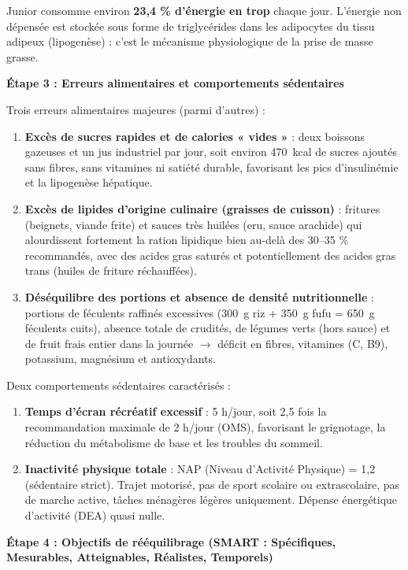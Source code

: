 \documentclass[11pt]{article}
\begin{document}
\begin{exoresolu}
Junior consomme environ \textbf{23,4 \% d'énergie en trop} chaque jour. L'énergie non dépensée est stockée sous forme de triglycérides dans les adipocytes du tissu adipeux (lipogenèse) : c'est le mécanisme physiologique de la prise de masse grasse.

\textbf{Étape 3 : Erreurs alimentaires et comportements sédentaires}

Trois erreurs alimentaires majeures (parmi d'autres) :
\begin{enumerate}
\item \textbf{Excès de sucres rapides et de calories « vides »} : deux boissons gazeuses et un jus industriel par jour, soit environ \SI{470}{kcal} de sucres ajoutés sans fibres, sans vitamines ni satiété durable, favorisant les pics d'insulinémie et la lipogenèse hépatique.
\item \textbf{Excès de lipides d'origine culinaire (graisses de cuisson)} : fritures (beignets, viande frite) et sauces très huilées (eru, sauce arachide) qui alourdissent fortement la ration lipidique bien au-delà des 30--35 \% recommandés, avec des acides gras saturés et potentiellement des acides gras trans (huiles de friture réchauffées).
\item \textbf{Déséquilibre des portions et absence de densité nutritionnelle} : portions de féculents raffinés excessives (\SI{300}{g} riz + \SI{350}{g} fufu = \SI{650}{g} féculents cuits), absence totale de crudités, de légumes verts (hors sauce) et de fruit frais entier dans la journée $\rightarrow$ déficit en fibres, vitamines (C, B9), potassium, magnésium et antioxydants.
\end{enumerate}

Deux comportements sédentaires caractérisés :
\begin{enumerate}
\item \textbf{Temps d'écran récréatif excessif} : 5 h/jour, soit 2,5 fois la recommandation maximale de 2 h/jour (OMS), favorisant le grignotage, la réduction du métabolisme de base et les troubles du sommeil.
\item \textbf{Inactivité physique totale} : NAP (Niveau d'Activité Physique) = 1,2 (sédentaire strict). Trajet motorisé, pas de sport scolaire ou extrascolaire, pas de marche active, tâches ménagères légères uniquement. Dépense énergétique d'activité (DEA) quasi nulle.
\end{enumerate}

\textbf{Étape 4 : Objectifs de rééquilibrage (SMART : Spécifiques, Mesurables, Atteignables, Réalistes, Temporels)}


\end{exoresolu}
\end{document}

